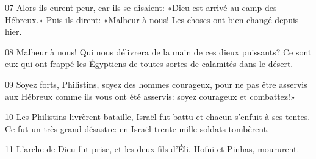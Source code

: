 
07 Alors ils eurent peur, car ils se disaient: «Dieu est arrivé au camp des Hébreux.» Puis ils dirent: «Malheur à nous! Les choses ont bien changé depuis hier.

08 Malheur à nous! Qui nous délivrera de la main de ces dieux puissants? Ce sont eux qui ont frappé les Égyptiens de toutes sortes de calamités dans le désert.

09 Soyez forts, Philistins, soyez des hommes courageux, pour ne pas être asservis aux Hébreux comme ils vous ont été asservis: soyez courageux et combattez!»

10 Les Philistins livrèrent bataille, Israël fut battu et chacun s’enfuit à ses tentes. Ce fut un très grand désastre: en Israël trente mille soldats tombèrent.

11 L’arche de Dieu fut prise, et les deux fils d’Éli, Hofni et Pinhas, moururent.